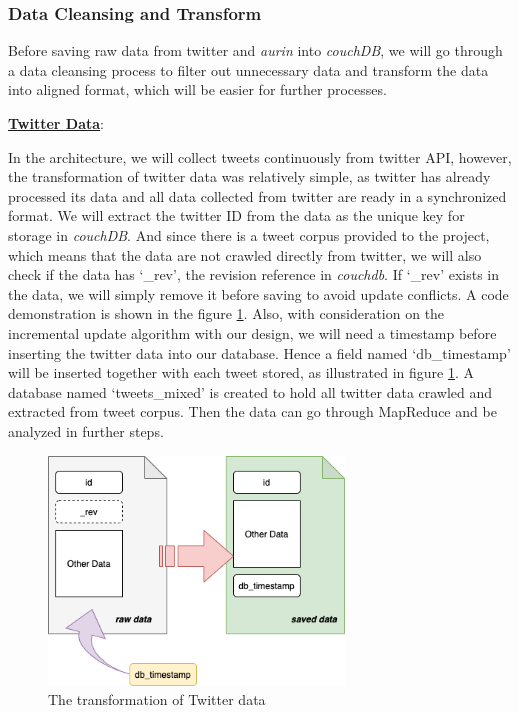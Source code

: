 \documentclass{article}
\begin{document}
\subsubsection{Data Cleansing and Transform}
Before saving raw data from twitter and \textit{aurin} into \textit{couchDB}, we will go through a data cleansing process to filter out unnecessary data and transform the data into aligned format, which will be easier for further processes. 

\textbf{\underline{Twitter Data}}: 

In the architecture, we will collect tweets continuously from twitter API, however, the transformation of twitter data was relatively simple, as twitter has already processed its data and all data collected from twitter are ready in a synchronized format. We will extract the twitter ID from the data as the unique key for storage in \textit{couchDB}. And since there is a tweet corpus provided to the project, which means that the data are not crawled directly from twitter, we will also check if the data has ‘\_rev’, the revision reference in \textit{couchdb}. If ‘\_rev’ exists in the data, we will simply remove it before saving to avoid update conflicts. A code demonstration is shown in the figure \ref{fig:twitterdata}.
Also, with consideration on the incremental update algorithm with our design, we will need a timestamp before inserting the twitter data into our database. Hence a field named ‘db\_timestamp’ will be inserted together with each tweet stored, as illustrated in figure \ref{fig:twitterdata}. A database named ‘tweets\_mixed’ is created to hold all twitter data crawled and extracted from tweet corpus. Then the data can go through MapReduce and be analyzed in further steps.
\begin{figure}
\centering
\includegraphics[width=0.7\textwidth]{img/twitterdata.png}
\caption{The transformation of Twitter data}
\label{fig:twitterdata}
\end{figure}
\end{document}
